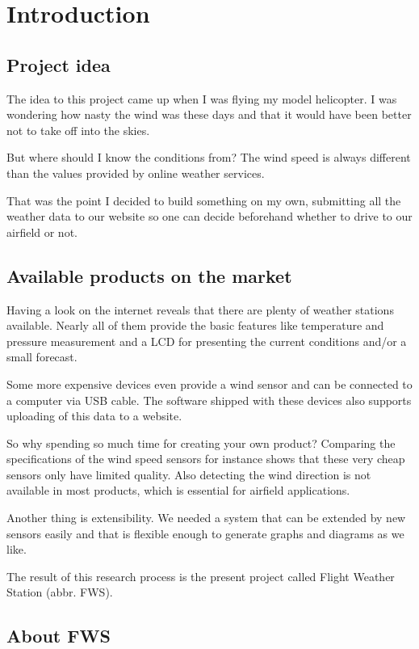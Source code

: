 
\chapter{Introduction}

\section{Project idea}
The idea to this project came up when I was flying my model helicopter. I was wondering how nasty the wind was these days and that it would have been better not to take off into the skies.

But where should I know the conditions from? The wind speed is always different than the values provided by online weather services.

That was the point I decided to build something on my own, submitting all the weather data to our website so one can decide beforehand whether to drive to our airfield or not.

\section{Available products on the market}
Having a look on the internet reveals that there are plenty of weather stations available. Nearly all of them provide the basic features like temperature and pressure measurement and a LCD for presenting the current conditions and/or a small forecast.

Some more expensive devices even provide a wind sensor and can be connected to a computer via USB cable. The software shipped with these devices also supports uploading of this data to a website.

So why spending so much time for creating your own product? Comparing the specifications of the wind speed sensors for instance shows that these very cheap sensors only have limited quality. Also detecting the wind direction is not available in most products, which is essential for airfield applications.

Another thing is extensibility. We needed a system that can be extended by new sensors easily and that is flexible enough to generate graphs and diagrams as we like.

The result of this research process is the present project called Flight Weather Station (abbr. FWS).

\section{About FWS} %
\label{sec:about_fws}

